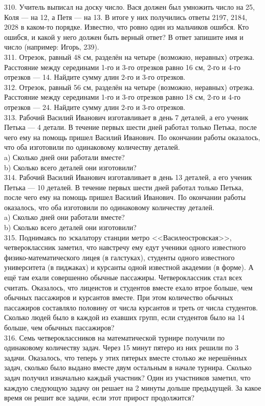 310. Учитель выписал на доску число. Вася должен был умножить число на 25, Коля --- на 12, а Петя --- на 13. В итоге у них получились ответы 2197, 2184, 2028 в каком-то порядке. Известно, что ровно один из мальчиков ошибся. Кто ошибся, и какой у него должен быть верный ответ? В ответ запишите имя и число (например: Игорь, 239).\\
311. Отрезок, равный 48 см, разделён на четыре (возможно, неравных) отрезка. Расстояние между серединами 1-го и 3-го отрезков равно 16 см, 2-го и 4-го отрезков --- 14. Найдите сумму длин 2-го и 3-го отрезков.\\
312. Отрезок, равный 56 см, разделён на четыре (возможно, неравных) отрезка. Расстояние между серединами 1-го и 3-го отрезков равно 18 см, 2-го и 4-го отрезков --- 24. Найдите сумму длин 2-го и 3-го отрезков.\\
313. Рабочий Василий Иванович изготавливает в день 7 деталей, а его ученик Петька --- 4 детали. В течение первых шести дней работал только Петька, после чего ему на помощь пришел Василий Иванович. По окончании работы оказалось, что оба изготовили по одинаковому количеству деталей.\\
a) Сколько дней они работали вместе?\\
b) Сколько всего деталей они изготовили?\\
314. Рабочий Василий Иванович изготавливает в день 13 деталей, а его ученик Петька --- 10 деталей. В течение первых шести дней работал только Петька, после чего ему на помощь пришел Василий Иванович. По окончании работы оказалось, что оба изготовили по одинаковому количеству деталей.\\
a) Сколько дней они работали вместе?\\
b) Сколько всего деталей они изготовили?\\
315. Поднимаясь по эскалатору станции метро <<Василеостровская>>, четвероклассник заметил, что навстречу ему едут ученики одного известного физико-математического лицея (в галстуках), студенты одного известного университета (в пиджаках) и курсанты одной известной академии (в форме). А ещё там ехали совершенно обычные пассажиры. Четвероклассник стал всех считать. Оказалось, что лицеистов и студентов вместе ехало втрое больше, чем обычных пассажиров и курсантов вместе. При этом количество обычных пассажиров составляло половину от числа курсантов и треть от числа студентов. Сколько людей было в каждой из ехавших групп, если студентов было на 14 больше, чем обычных пассажиров?\\
316. Семь четвероклассников на математической турнире получили по одинаковому количеству задач. Через 15 минут пятеро из них решили по 3 задачи. Оказалось, что теперь у этих пятерых вместе столько же нерешённых задач, сколько было выдано вместе двум остальным в начале турнира. Сколько задач получил изначально каждый участник? Один из участников заметил, что каждую следующую задачу он решает на 2 минуты дольше предыдущей. За какое время он решит все задачи, если этот прирост продолжится?\\
